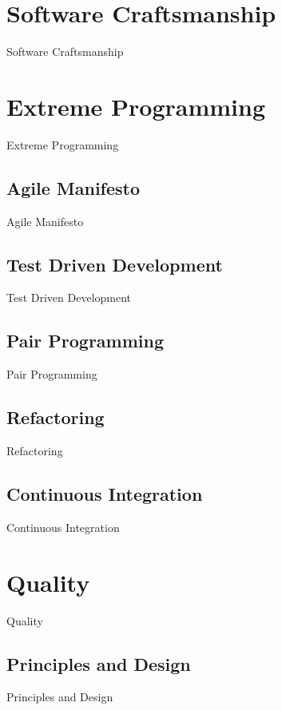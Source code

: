 \section{Software Craftsmanship}\label{sec:software-craftsmanship}
Software Craftsmanship



\section{Extreme Programming}\label{sec:extreme-programming}
Extreme Programming


\subsection{Agile Manifesto}\label{subsec:agile-manifesto2}
Agile Manifesto


\subsection{Test Driven Development}\label{subsec:test-driven-development}
Test Driven Development


\subsection{Pair Programming}\label{subsec:pair-programming}
Pair Programming


\subsection{Refactoring}\label{subsec:refactoring}
Refactoring


\subsection{Continuous Integration}\label{subsec:continuous-integration}
Continuous Integration



\section{Quality}\label{sec:quality}
Quality


\subsection{Principles and Design}\label{subsec:principles}
Principles and Design


